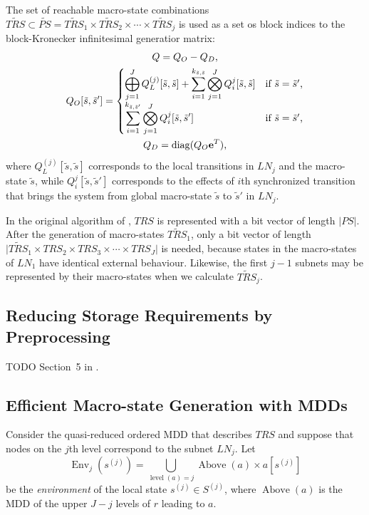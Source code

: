 \documentclass[a4paper,11pt,twoside,openright]{memoir}
\newcommand*{\LN}{\textit{LN}}
\renewcommand*{\vec}[1]{\boldsymbol{\mathrm{#1}}}
\newcommand*{\TRS}{\textit{TRS}}
\newcommand*{\PS}{\textit{PS}}
\newcommand*{\macroS}{}\let\macroS\tilde
\newcommand*{\macroStates}{}\let\macroStates\widetilde
\newcommand*{\macroTRS}{\macroStates{\TRS}}
\DeclareMathOperator{\diag}{diag}
\DeclareMathOperator{\level}{level}
\DeclareMathOperator{\Env}{Env}
\DeclareMathOperator{\Above}{Above}
\theoremstyle{my}
\begin{document}
The set of reachable macro-state combinations
$\macroTRS \subset \macroStates{\PS} = \macroTRS_1 \times \macroTRS_2
\times \cdots \times \macroTRS_j$
is used as a set os block indices to the block-Kronecker infinitesimal
generatior matrix:
\begin{gather}
  Q = Q_O - Q_D \text, \\
  Q_O[\macroS{s}, \macroS{s}'] = \begin{cases} \displaystyle
    \bigoplus_{j = 1}^J Q_L^{(j)}[\macroS{s}, \macroS{s}] + \sum_{i =
      1}^{k_{\macroS{s}, \macroS{s}}} \bigotimes_{j = 1}^J
    Q_{i}^{j}[\macroS{s},
    \macroS{s}] & \text{if $\macroS{s} = \macroS{s}'$,} \\
    \displaystyle \sum_{i = 1}^{k_{\macroS{s}, \macroS{s}'}}
    \bigotimes_{j = 1}^J Q_{i}^{j}[\macroS{s}, \macroS{s}'] & \text{if
      $\macroS{s} = \macroS{s}'$,}
  \end{cases} \\
  Q_D = \diag (Q_O \vec{e}^T) \text,
\end{gather}
where $Q_L^{(j)}[\macroS{s}, \macroS{s}]$ corresponds to the local
transitions in $\LN_j$ and the macro-state $\macroS{s}$, while
$Q_{i}^{j}[\macroS{s}, \macroS{s}']$ corresponds to the effects of
$i$th synchronized transition that brings the system from global
macro-state $\macroS{s}$ to $\macroS{s}'$ in $\LN_j$.

In the original algorithm of \citet{DBLP:journals/tse/Buchholz99},
$\TRS$ is represented with a bit vector of length $\lvert \PS
\rvert$.
After the generation of macro-states $\macroTRS_1$, only a bit vector
of length
$\lvert \macroTRS_1 \times \TRS_2 \times \TRS_3 \times \cdots \times
\TRS_J \rvert$
is needed, because states in the macro-states of $\LN_1$ have
identical external behaviour. Likewise, the first $j - 1$ subnets may
be represented by their macro-states when we calculate $\macroTRS_j$.

\subsection{Reducing Storage Requirements by Preprocessing}

TODO Section~5 in \citet{DBLP:journals/tse/Buchholz99}.

\subsection{Efficient Macro-state Generation with MDDs}

Consider the quasi-reduced ordered MDD that describes $\TRS$ and
suppose that nodes on the $j$th level correspond to the subnet
$\LN_j$. Let
\begin{equation}
  \Env_j(s^{(j)}) = \bigcup_{\level(a) = j} \Above(a) \times a[s^{(j)}]
\end{equation}
be the \emph{environment} of the local state $s^{(j)} \in S^{(j)}$,
where $\Above(a)$ is the MDD of the upper $J - j$ levels of $r$
leading to $a$.
\end{document}

